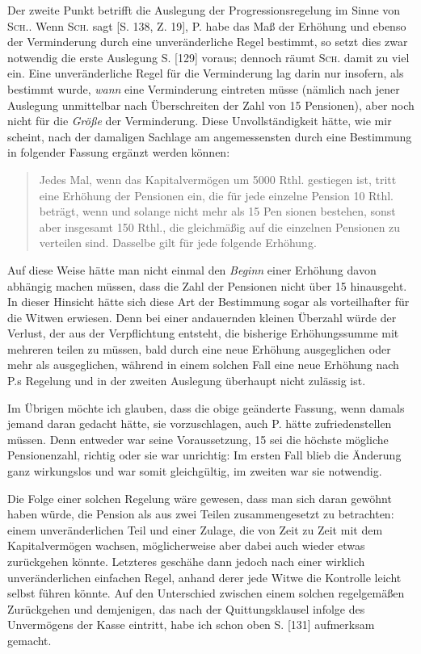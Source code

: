 Der zweite Punkt betrifft die Auslegung der Progressionsregelung im Sinne von \textsc{Sch.}. Wenn \textsc{Sch.} sagt [S. 138, Z. 19], P. habe das Maß der Erhöhung und ebenso der Verminderung durch eine unveränderliche Regel bestimmt, so setzt dies zwar notwendig die erste Auslegung S. [129] voraus; dennoch räumt \textsc{Sch.} damit zu viel ein. Eine unveränderliche Regel für die Verminderung lag darin nur insofern, als bestimmt wurde, \textit{wann} eine Verminderung eintreten müsse (nämlich nach jener Auslegung unmittelbar nach Überschreiten der Zahl von 15 Pensionen), aber noch nicht für die \textit{Größe} der Verminderung. Diese Unvollständigkeit hätte, wie mir scheint, nach der damaligen Sachlage am angemessensten durch eine Bestimmung in folgender Fassung ergänzt werden können:
\begin{quote}
Jedes Mal, wenn das Kapitalvermögen um 5000 Rthl. gestiegen ist, tritt eine Erhöhung der Pensionen ein, die für jede einzelne Pension 10 Rthl. beträgt, wenn und solange nicht mehr als 15 Pen%
sionen bestehen, sonst aber insgesamt 150 Rthl., die gleichmäßig auf die einzelnen Pensionen zu verteilen sind. Dasselbe gilt für jede folgende Erhöhung.
\end{quote}
\noindent Auf diese Weise hätte man nicht einmal den \textit{Beginn} einer Erhöhung davon abhängig machen müssen, dass die Zahl der Pensionen nicht über 15 hinausgeht. In dieser Hinsicht hätte sich diese Art der Bestimmung sogar als vorteilhafter für die Witwen erwiesen. Denn bei einer andauernden kleinen Überzahl würde der Verlust, der aus der Verpflichtung entsteht, die bisherige Erhöhungssumme mit mehreren teilen zu müssen, bald durch eine neue Erhöhung ausgeglichen oder mehr als ausgeglichen, während in einem solchen Fall eine neue Erhöhung nach P.s Regelung und in der zweiten Auslegung überhaupt nicht zulässig ist.

Im Übrigen möchte ich glauben, dass die obige geänderte Fassung, wenn damals jemand daran gedacht hätte, sie vorzuschlagen, auch P. hätte zufriedenstellen müssen. Denn entweder war seine Voraussetzung, 15 sei die höchste mögliche Pensionenzahl, richtig oder sie war unrichtig: Im ersten Fall blieb die Änderung ganz wirkungslos und war somit gleichgültig, im zweiten war sie notwendig.

Die Folge einer solchen Regelung wäre gewesen, dass man sich daran gewöhnt haben würde, die Pension als aus zwei Teilen zusammengesetzt zu betrachten: einem unveränderlichen Teil und einer Zulage, die von Zeit zu Zeit mit dem Kapitalvermögen wachsen, möglicherweise aber dabei auch wieder etwas zurückgehen könnte. Letzteres geschähe dann jedoch nach einer wirklich unveränderlichen einfachen Regel, anhand derer jede Witwe die Kontrolle leicht selbst führen könnte. Auf den Unterschied zwischen einem solchen regelgemäßen Zurückgehen und demjenigen, das nach der Quittungsklausel infolge des Unvermögens der Kasse eintritt, habe ich schon oben S. [131] aufmerksam gemacht.

